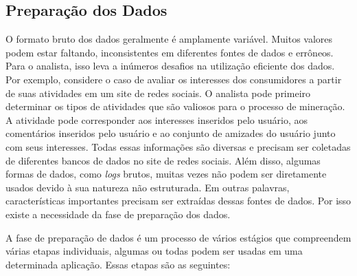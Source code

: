 \subsection{Preparação dos Dados}
O formato bruto dos dados geralmente é amplamente variável. Muitos valores podem estar faltando, inconsistentes em diferentes fontes de dados e errôneos. Para o analista, isso leva a inúmeros desafios na utilização eficiente dos dados. Por exemplo, considere o caso de avaliar os interesses dos consumidores a partir de suas atividades em um site de redes sociais. O analista pode primeiro determinar os tipos de atividades que são valiosos para o processo de mineração. A atividade pode corresponder aos interesses inseridos pelo usuário, aos comentários inseridos pelo usuário e ao conjunto de amizades do usuário junto com seus interesses. Todas essas informações são diversas e precisam ser coletadas de diferentes bancos de dados no site de redes sociais. Além disso, algumas formas de dados, como \textit{logs} brutos, muitas vezes não podem ser diretamente usados devido à sua natureza não estruturada. Em outras palavras, características importantes precisam ser extraídas dessas fontes de dados. Por isso existe a necessidade da fase de preparação dos dados.

A fase de preparação de dados é um processo de vários estágios que compreendem várias etapas individuais, algumas ou todas podem ser usadas em uma determinada aplicação. Essas etapas são as seguintes:


